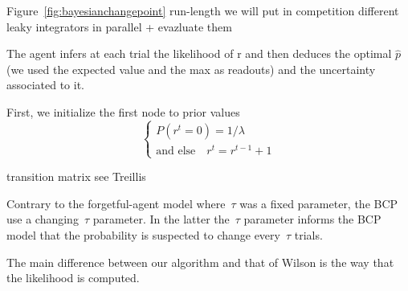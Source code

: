 \documentclass[profile,final,english,draft]{article}%
\newcommand{\choice}[1]{ %
	\left\{ %
		\begin{array}{l} #1 \end{array} %
	\right. }
\newcommand{\eql}[1]{\begin{equation}#1\end{equation}}
\newcommand{\seeFig}[1]{Figure~\ref{fig:#1}}
\begin{document}



\seeFig{bayesianchangepoint}
run-length we will put in competition different leaky integrators in parallel + evazluate them 


The agent infers at each trial the likelihood  of r and then deduces the optimal $\hat{p}$ (we used the expected value and the max as readouts) and the uncertainty associated to it. 

First, we initialize the first node to prior values
\eql{\choice{
P(r^t = 0) = 1 / \lambda  \\
\text{and else} \quad r^t = r^{t-1} +1 }\label{eq:run_length2}}

transition matrix see Treillis

Contrary to the forgetful-agent model where~$\tau$ was a fixed parameter, the BCP use a changing~$\tau$ parameter. In the latter the~$\tau$ parameter informs the BCP model that the probability is suspected to change every~$\tau$ trials.



The main difference between our algorithm and that of Wilson is the way that the likelihood is computed.
\end{document}
